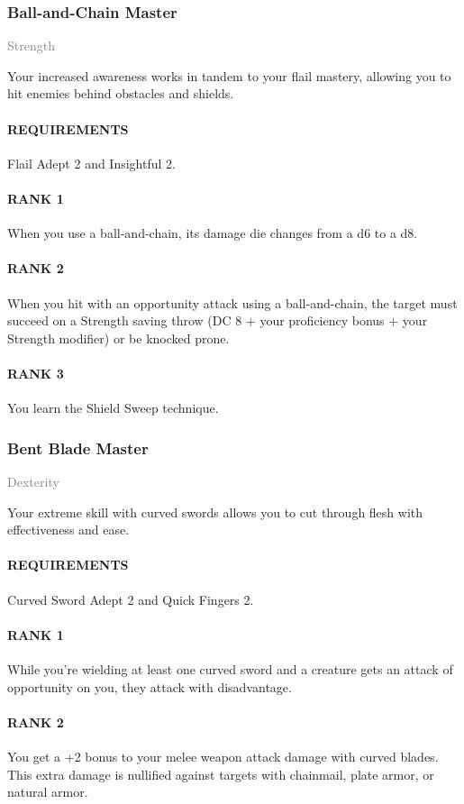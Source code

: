 \subsubsection{Ball-and-Chain Master} \label{feat::ballandchainmaster}
\small{\textcolor{gray}{Strength}}

\normalsize
Your increased awareness works in tandem to your flail mastery, allowing you to hit enemies behind obstacles and shields.
\paragraph{REQUIREMENTS} Flail Adept 2 and Insightful 2.
\paragraph{RANK 1} When you use a ball-and-chain, its damage die changes from a d6 to a d8.
\paragraph{RANK 2} When you hit with an opportunity attack using a ball-and-chain, the target must succeed on a Strength saving throw (DC 8 + your proficiency bonus + your Strength modifier) or be knocked prone.
\paragraph{RANK 3} You learn the Shield Sweep technique.

\subsubsection{Bent Blade Master} \label{feat::bentblademaster}
\small{\textcolor{gray}{Dexterity}}

\normalsize
Your extreme skill with curved swords allows you to cut through flesh with effectiveness and ease.
\paragraph{REQUIREMENTS} Curved Sword Adept 2 and Quick Fingers 2.
\paragraph{RANK 1} While you're wielding at least one curved sword and a creature gets an attack of opportunity on you, they attack with disadvantage.
\paragraph{RANK 2} You get a +2 bonus to your melee weapon attack damage with curved blades.
This extra damage is nullified against targets with chainmail, plate armor, or natural armor.
